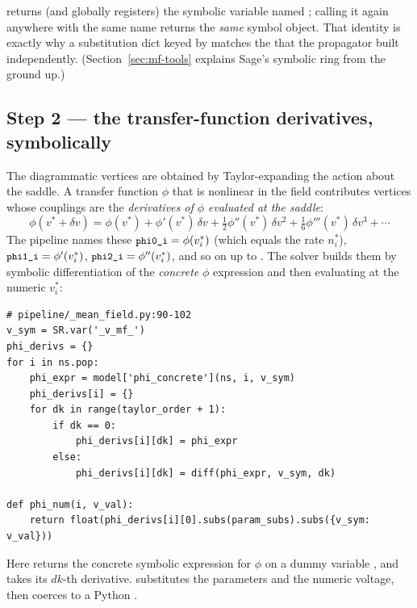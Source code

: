  returns (and globally registers) the symbolic variable named
; calling it again anywhere with the same name returns the \emph{same}
symbol object. That identity is exactly why a substitution dict keyed by
 matches the  that the propagator built
independently. (Section~\ref{sec:mf-tools} explains Sage's symbolic ring from the
ground up.)

\subsection{Step 2 --- the transfer-function derivatives, symbolically}

The diagrammatic vertices are obtained by Taylor-expanding the action about the
saddle. A transfer function $\phi$ that is nonlinear in the field contributes
vertices whose couplings are the \emph{derivatives of $\phi$ evaluated at the
saddle}:
\begin{equation}
  \phi(v^{*} + \delta v) = \phi(v^{*}) + \phi'(v^{*})\,\delta v
    + \tfrac{1}{2}\phi''(v^{*})\,\delta v^{2}
    + \tfrac{1}{6}\phi'''(v^{*})\,\delta v^{3} + \cdots
  \label{eq:mf-taylor}
\end{equation}
The pipeline names these $\texttt{\small phi0\_i} = \phi(v^{*}_i)$ (which equals the rate
$n^{*}_i$), $\texttt{\small phi1\_i} = \phi'(v^{*}_i)$, $\texttt{\small phi2\_i} = \phi''(v^{*}_i)$,
and so on up to . The solver builds them by symbolic
differentiation of the \emph{concrete} $\phi$ expression and then evaluating at
the numeric $v^{*}_i$:

\begin{lstlisting}
# pipeline/_mean_field.py:90-102
v_sym = SR.var('_v_mf_')
phi_derivs = {}
for i in ns.pop:
    phi_expr = model['phi_concrete'](ns, i, v_sym)
    phi_derivs[i] = {}
    for dk in range(taylor_order + 1):
        if dk == 0:
            phi_derivs[i][dk] = phi_expr
        else:
            phi_derivs[i][dk] = diff(phi_expr, v_sym, dk)

def phi_num(i, v_val):
    return float(phi_derivs[i][0].subs(param_subs).subs({v_sym: v_val}))
\end{lstlisting}

Here  returns the concrete symbolic
expression for $\phi$ on a dummy variable , and
 takes its $dk$-th derivative. 
substitutes the parameters and the numeric voltage, then coerces to a Python
.

